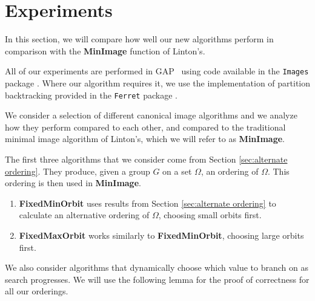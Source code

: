 
\section{Experiments}\label{sec:ex}

In this section, we will compare how well our new algorithms perform in
comparison with the \textbf{MinImage} function of Linton's.

All of our experiments are performed in GAP~\cite{GAP4} using code available in
the \texttt{Images} package \cite{Images}.
Where our algorithm requires it, we use the implementation of partition
backtracking provided in the \texttt{Ferret} package \cite{Fer}.

We consider a selection of different canonical image algorithms and we analyze how
they perform compared to each other, and compared to the traditional minimal image
algorithm of Linton's, which we will refer to as \textbf{MinImage}.

The first three algorithms that we consider come from Section \ref{sec:alternate
ordering}. They produce, given a group \(G\) on a set \(\Omega\), an ordering of
\(\Omega\). This ordering is then used in \textbf{MinImage}.

\begin{enumerate}
\item \textbf{FixedMinOrbit} uses results from Section \ref{sec:alternate ordering}
  to calculate an alternative ordering of \(\Omega\), choosing small orbits first.
\item \textbf{FixedMaxOrbit} works similarly to \textbf{FixedMinOrbit}, choosing large
  orbits first.
\end{enumerate}

We also consider algorithms that dynamically choose which value to branch on as
search progresses. We will use the following lemma for the proof of correctness
for all our orderings.


